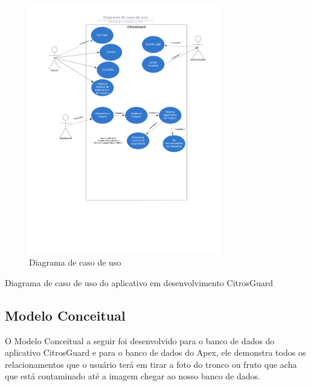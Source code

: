 \documentclass[
  a4paper,%
  12pt,%
  english,%
  brazilian,%
]{article}
\begin{document}
            \begin{figure}[h]
\centering
\caption{Diagrama de caso de uso}%
\label{fig:diagrama-caso-uso}
 \includegraphics[width=0.75\textwidth]{Logos/Diagrama de caso de uso.png}
\end{figure}

    Diagrama de caso de uso do aplicativo em desenvolvimento CitrosGuard
    
    \subsection*{Modelo Conceitual}

    O Modelo Conceitual a seguir foi desenvolvido para o banco de dados do aplicativo CitrosGuard e para o banco de dados do Apex, ele demonstra todos os relacionamentos que o usuário terá em tirar a foto do tronco ou fruto que acha que está contaminado até a imagem chegar ao nosso banco de dados.
\end{document}
